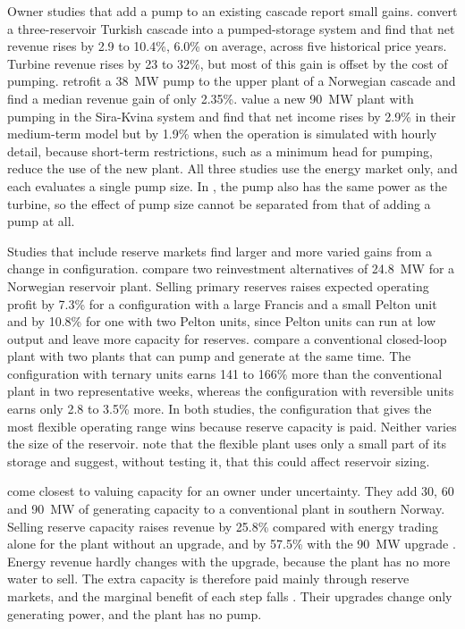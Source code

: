 Owner studies that add a pump to an existing cascade report small
gains. \citet{ak2019quantifying} convert a three-reservoir Turkish
cascade into a pumped-storage system and find that net revenue rises by
2.9 to 10.4\%, 6.0\% on average, across five historical price years.
Turbine revenue rises by 23 to 32\%, but most of this gain is offset by
the cost of pumping. \citet{alic2023optimal} retrofit a \SI{38}{\mega\watt}
pump to the upper plant of a Norwegian cascade and find a median revenue
gain of only 2.35\%. \citet{schuller2024practical} value a new
\SI{90}{\mega\watt} plant with pumping in the Sira-Kvina system and find
that net income rises by 2.9\% in their medium-term model but by 1.9\%
when the operation is simulated with hourly detail, because short-term
restrictions, such as a minimum head for pumping, reduce the use of the
new plant. All three studies use the energy market only, and each
evaluates a single pump size. In \citet{alic2023optimal}, the pump also
has the same power as the turbine, so the effect of pump size cannot be
separated from that of adding a pump at all.

Studies that include reserve markets find larger and more varied gains
from a change in configuration. \citet{helseth2017iet} compare two
reinvestment alternatives of \SI{24.8}{\mega\watt} for a Norwegian
reservoir plant. Selling primary reserves raises expected operating
profit by 7.3\% for a configuration with a large Francis and a small Pelton
unit and by 10.8\% for one with two Pelton units, since Pelton units can run at low
output and leave more capacity for reserves. \citet{chazarra2017}
compare a conventional closed-loop plant with two plants that can pump
and generate at the same time. The configuration with ternary units
earns 141 to 166\% more than the conventional plant in two
representative weeks, whereas the configuration with reversible units
earns only 2.8 to 3.5\% more. In both studies, the configuration that
gives the most flexible operating range wins because reserve capacity is
paid. Neither varies the size of the reservoir. \citet{chazarra2017}
note that the flexible plant uses only a small part of its storage and
suggest, without testing it, that this could affect reservoir sizing.

\citet{bore2026assessing} come closest to valuing capacity for an owner
under uncertainty. They add 30, 60 and
\SI{90}{\mega\watt} of generating capacity to a conventional plant in
southern Norway. Selling reserve capacity raises revenue by 25.8\% compared with energy
trading alone for the plant without an upgrade, and by 57.5\% with the
\SI{90}{\mega\watt} upgrade \citep{bore2026}. Energy
revenue hardly changes with the upgrade, because the plant has no more
water to sell. The extra capacity is therefore paid mainly through
reserve markets, and the marginal benefit of each step falls
\citep{bore2026assessing}. Their upgrades change only generating power,
and the plant has no pump.

